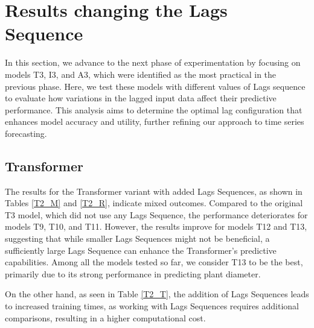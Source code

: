 \section{Results changing the Lags Sequence}
In this section, we advance to the next phase of experimentation by focusing on models T3, I3, and A3, which were identified as the most practical in the previous phase. Here, we test these models with different values of Lags sequence to evaluate how variations in the lagged input data affect their predictive performance. This analysis aims to determine the optimal lag configuration that enhances model accuracy and utility, further refining our approach to time series forecasting.

\subsection{Transformer}
The results for the Transformer variant with added Lags Sequences, as shown in Tables \ref{T2_M} and \ref{T2_R}, indicate mixed outcomes. Compared to the original T3 model, which did not use any Lags Sequence, the performance deteriorates for models T9, T10, and T11. However, the results improve for models T12 and T13, suggesting that while smaller Lags Sequences might not be beneficial, a sufficiently large Lags Sequence can enhance the Transformer's predictive capabilities. Among all the models tested so far, we consider T13 to be the best, primarily due to its strong performance in predicting plant diameter.

On the other hand, as seen in Table \ref{T2_T}, the addition of Lags Sequences leads to increased training times, as working with Lags Sequences requires additional comparisons, resulting in a higher computational cost.


